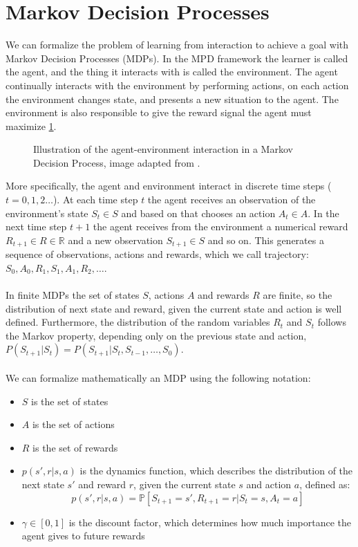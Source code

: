 \section{Markov Decision Processes}
We can formalize the problem of learning from interaction to achieve a goal with Markov Decision Processes (MDPs). In the MPD framework the learner is called the agent, and the thing it interacts with is called the environment. The agent continually interacts with the environment by performing actions, on each action the environment changes state, and presents a new situation to the agent. The environment is also responsible to give the reward signal the agent must maximize \ref{fig:mdp}.
\begin{figure}[H]
    \centering
    
    \caption{Illustration of the agent-environment interaction in a Markov Decision Process, image adapted from \cite{sutton-barto}.}
    \label{fig:mdp}
\end{figure}
More specifically, the agent and environment interact in discrete time steps ($t=0, 1, 2 \dots$). At each time step $t$ the agent receives an observation of the environment's state $S_t \in S$ and based on that chooses an action $A_t \in A$. In the next time step $t+1$ the agent receives from the environment a numerical reward $R_{t+1} \in R \in \mathbb{R}$ and a new observation $S_{t+1} \in S$ and so on. This generates a sequence of observations, actions and rewards, which we call trajectory: $S_0, A_0, R_1, S_1, A_1, R_2, \dots$.\\\\
In finite MDPs the set of states $S$, actions $A$ and rewards $R$ are finite, so the distribution of next state and reward, given the current state and action is well defined. Furthermore, the distribution of the random variables $R_t$ and $S_t$ follows the Markov property, depending only on the previous state and action, $P(S_{t+1}|S_t) = P(S_{t+1}|S_t, S_{t-1}, \dots, S_0)$.\\\\
We can formalize mathematically an MDP using the following notation:
\begin{itemize}
    \item $S$ is the set of states
    \item $A$ is the set of actions
    \item $R$ is the set of rewards
    \item $p(s', r | s, a)$ is the dynamics function, which describes the distribution of the next state $s'$ and reward $r$, given the current state $s$ and action $a$, defined as:
    \begin{equation}
        p(s', r | s, a) = \mathds{P}[S_{t+1} = s', R_{t+1} = r | S_t = s, A_t = a]
        \label{dynamics-function}
    \end{equation}
    \item $\gamma \in [0, 1]$ is the discount factor, which determines how much importance the agent gives to future rewards
\end{itemize}

